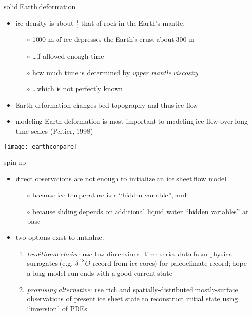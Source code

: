 \begin{frame}{solid Earth deformation}

\begin{itemize}
\item ice density is about $\frac{1}{3}$ that of rock in the Earth's mantle,
  \begin{itemize}
  \item[$\circ$] 1000 m of ice depresses the Earth's crust about 300 m
  \item[$\circ$] \dots if allowed enough time
  \item[$\circ$] how much time is determined by \emph{upper mantle viscosity}
  \item[$\circ$] \dots which is not perfectly known
  \end{itemize}
\item Earth deformation changes bed topography and thus ice flow
\item modeling Earth deformation is most important to modeling ice flow over long time scales (Peltier, 1998)\nocite{Peltier1998review}
\end{itemize}

\begin{center}
  \texttt{[image: earthcompare]}
\end{center}
\end{frame}


\begin{frame}{spin-up}

\begin{itemize}
\item direct observations are not enough to initialize an ice sheet flow model
  \begin{itemize}
  \item[$\circ$] because ice temperature is a ``hidden variable'', and
  \item[$\circ$] because sliding depends on additional liquid water ``hidden variables'' at base
  \end{itemize}
\item two options exist to initialize:
  \small
  \begin{enumerate}
  \item \emph{traditional choice}: use low-dimensional time series data from physical surrogates (e.g. $\delta \phantom{|}^{18}O$ record from ice cores) for paleoclimate record; hope a long model run ends with a good current state
  \item \emph{promising alternative}:  use rich and spatially-distributed mostly-surface observations of present ice sheet state to reconstruct initial state using ``inversion'' of PDEs
  \normalsize
  \end{enumerate}
\end{itemize}
\end{frame}


